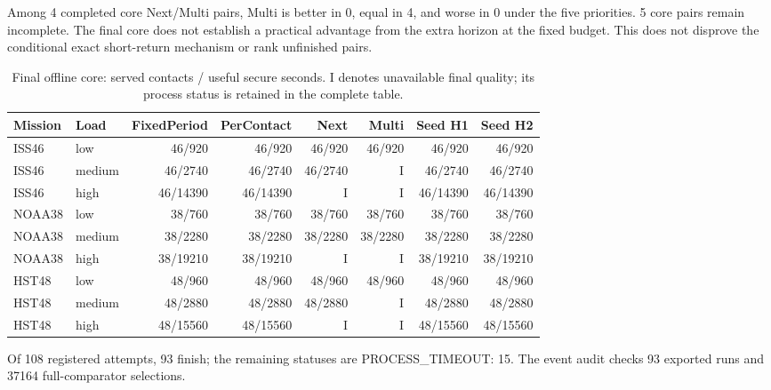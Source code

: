 Among 4 completed core Next/Multi pairs, Multi is better in 0, equal in 4, and worse in 0 under the five priorities. 5 core pairs remain incomplete. The final core does not establish a practical advantage from the extra horizon at the fixed budget. This does not disprove the conditional exact short-return mechanism or rank unfinished pairs.

\begin{table}[t]
\centering\footnotesize
\caption{Final offline core: served contacts / useful secure seconds. I denotes unavailable final quality; its process status is retained in the complete table.}
\label{tab:core}
\begin{tabular}{llrrrrrr}\toprule
Mission & Load & FixedPeriod & PerContact & Next & Multi & Seed H1 & Seed H2 \\ \midrule
ISS46 & low & 46/920 & 46/920 & 46/920 & 46/920 & 46/920 & 46/920 \\
ISS46 & medium & 46/2740 & 46/2740 & 46/2740 & I & 46/2740 & 46/2740 \\
ISS46 & high & 46/14390 & 46/14390 & I & I & 46/14390 & 46/14390 \\
NOAA38 & low & 38/760 & 38/760 & 38/760 & 38/760 & 38/760 & 38/760 \\
NOAA38 & medium & 38/2280 & 38/2280 & 38/2280 & 38/2280 & 38/2280 & 38/2280 \\
NOAA38 & high & 38/19210 & 38/19210 & I & I & 38/19210 & 38/19210 \\
HST48 & low & 48/960 & 48/960 & 48/960 & 48/960 & 48/960 & 48/960 \\
HST48 & medium & 48/2880 & 48/2880 & 48/2880 & I & 48/2880 & 48/2880 \\
HST48 & high & 48/15560 & 48/15560 & I & I & 48/15560 & 48/15560 \\
\bottomrule\end{tabular}\end{table}

Of 108 registered attempts, 93 finish; the remaining statuses are PROCESS\_TIMEOUT: 15. The event audit checks 93 exported runs and 37164 full-comparator selections.
